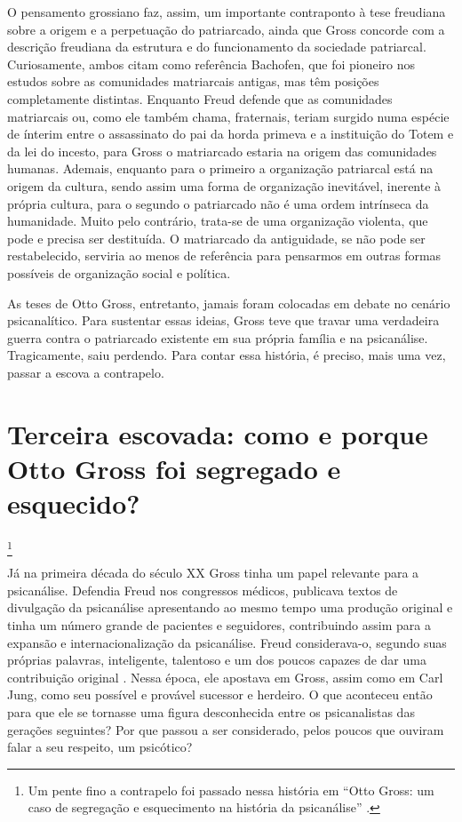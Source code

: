 O pensamento grossiano faz, assim, um importante contraponto à tese
freudiana sobre a origem e a perpetuação do patriarcado, ainda que Gross
concorde com a descrição freudiana da estrutura e do funcionamento da
sociedade patriarcal. Curiosamente, ambos citam como referência
Bachofen, que foi pioneiro nos estudos sobre as comunidades matriarcais
antigas, mas têm posições completamente distintas. Enquanto Freud
defende que as comunidades matriarcais ou, como ele também chama,
fraternais, teriam surgido numa espécie de ínterim entre o assassinato
do pai da horda primeva e a instituição do Totem e da lei do incesto,
para Gross o matriarcado estaria na origem das comunidades humanas.
Ademais, enquanto para o primeiro a organização patriarcal está na
origem da cultura, sendo assim uma forma de organização inevitável,
inerente à própria cultura, para o segundo o patriarcado não é uma ordem
intrínseca da humanidade. Muito pelo contrário, trata-se de uma
organização violenta, que pode e precisa ser destituída. O matriarcado
da antiguidade, se não pode ser restabelecido, serviria ao menos de
referência para pensarmos em outras formas possíveis de organização
social e política.

As teses de Otto Gross, entretanto, jamais foram colocadas em debate no
cenário psicanalítico. Para sustentar essas ideias, Gross teve que
travar uma verdadeira guerra contra o patriarcado existente em sua
própria família e na psicanálise. Tragicamente, saiu perdendo. Para
contar essa história, é preciso, mais uma vez, passar a escova a
contrapelo.

\section{Terceira escovada: como e porque Otto Gross foi segregado e
esquecido?}\footnote{Um pente fino a contrapelo foi passado nessa
  história em ``Otto Gross: um caso de segregação e esquecimento na
  história da psicanálise'' .}

Já na primeira década do século XX Gross tinha um papel relevante para a
psicanálise. Defendia Freud nos congressos médicos, publicava textos de
divulgação da psicanálise apresentando ao mesmo tempo uma produção
original e tinha um número grande de pacientes e seguidores,
contribuindo assim para a expansão e internacionalização da psicanálise.
Freud considerava-o, segundo suas próprias palavras, inteligente,
talentoso e um dos poucos capazes de dar uma contribuição original .
Nessa época, ele apostava em Gross, assim como em Carl Jung, como seu
possível e provável sucessor e herdeiro. O que aconteceu então para que
ele se tornasse uma figura desconhecida entre os psicanalistas das
gerações seguintes? Por que passou a ser considerado, pelos poucos que
ouviram falar a seu respeito, um psicótico?

